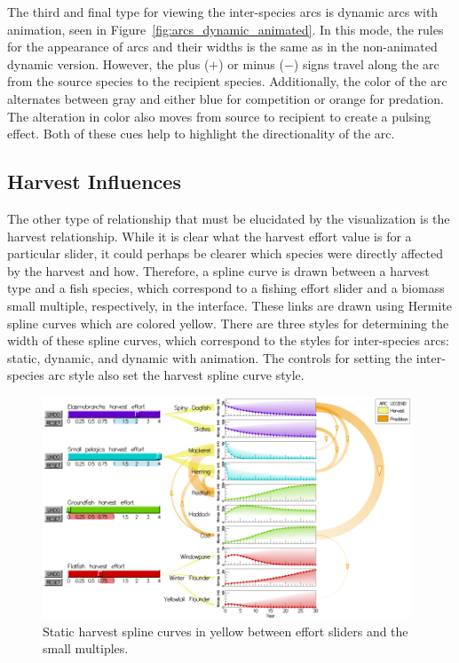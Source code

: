 The third and final type for viewing the inter-species arcs is dynamic arcs with animation, seen in Figure~\ref{fig:arcs_dynamic_animated}.  In this mode, the rules for the appearance of arcs and their widths is the same as in the non-animated dynamic version.  However, the plus ($+$) or minus ($-$) signs travel along the arc from the source species to the recipient species.  Additionally, the color of the arc alternates between gray and either blue for competition or orange for predation.  The alteration in color also moves from source to recipient to create a pulsing effect.  Both of these cues help to highlight the directionality of the arc.

\subsection{Harvest Influences}

The other type of relationship that must be elucidated by the visualization is the harvest relationship.  While it is clear what the harvest effort value is for a particular slider, it could perhaps be clearer which species were directly affected by the harvest and how.  Therefore, a spline curve is drawn between a harvest type and a fish species, which correspond to a fishing effort slider and a biomass small multiple, respectively, in the interface.  These links are drawn using Hermite spline curves which are colored yellow.  There are three styles for determining the width of these spline curves, which correspond to the styles for inter-species arcs: static, dynamic, and dynamic with animation.  The controls for setting the inter-species arc style also set the harvest spline curve style.  

\begin{figure}[h]
	\centering
	\includegraphics[width=0.98\textwidth]{figures/png/harvest_splines.png}
	\caption[Static harvest spline curves in yellow between effort sliders and the small multiples]{Static harvest spline curves in yellow between effort sliders and the small multiples.}
	\label{fig:harvest_splines}
\end{figure}

